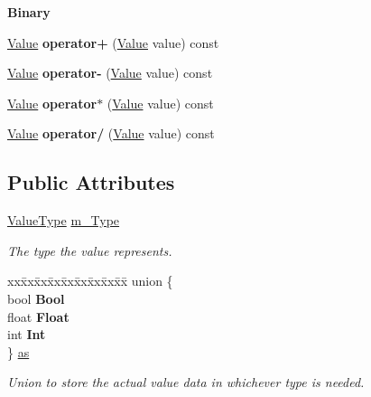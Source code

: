 \begin{Indent}\textbf{ Binary}\par
\begin{DoxyCompactItemize}
\item 
\mbox{\label{class_value_ab931af91c440a1b9f47d0265ef402ea4}} 
\hyperlink{class_value}{Value} {\bfseries operator+} (\hyperlink{class_value}{Value} value) const
\item 
\mbox{\label{class_value_ace4a2492efcb89572c714379d1e74e7e}} 
\hyperlink{class_value}{Value} {\bfseries operator-\/} (\hyperlink{class_value}{Value} value) const
\item 
\mbox{\label{class_value_a7cc767814fa7d1e89c72c61505e98577}} 
\hyperlink{class_value}{Value} {\bfseries operator$\ast$} (\hyperlink{class_value}{Value} value) const
\item 
\mbox{\label{class_value_ace9a34b248f6139ed55f86df4b33b31b}} 
\hyperlink{class_value}{Value} {\bfseries operator/} (\hyperlink{class_value}{Value} value) const
\end{DoxyCompactItemize}
\end{Indent}
\subsection*{Public Attributes}
\begin{DoxyCompactItemize}
\item 
\mbox{\label{class_value_a09ab6d6ee1179da469d69c6e555fa195}} 
\hyperlink{_value_8h_ad9971b6ef33e02ba2c75d19c1d2518a1}{Value\+Type} \hyperlink{class_value_a09ab6d6ee1179da469d69c6e555fa195}{m\+\_\+\+Type}
\begin{DoxyCompactList}\small\item\em The type the value represents. \end{DoxyCompactList}\item 
\mbox{\label{class_value_a4a874fca963ff11e5f3eae35e32d6a04}} 
\begin{tabbing}
xx\=xx\=xx\=xx\=xx\=xx\=xx\=xx\=xx\=\kill
union \{\\
\>bool {\bfseries Bool}\\
\>float {\bfseries Float}\\
\>int {\bfseries Int}\\
\} \hyperlink{class_value_a4a874fca963ff11e5f3eae35e32d6a04}{as}\\

\end{tabbing}\begin{DoxyCompactList}\small\item\em Union to store the actual value data in whichever type is needed. \end{DoxyCompactList}\end{DoxyCompactItemize}


